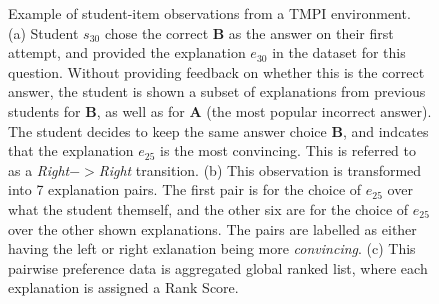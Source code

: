 \documentclass[notitlepage,12pt]{jedm}
\begin{document}
\begin{figure}
	\caption{
		Example of student-item observations from a TMPI environment. 
		(a) Student $s_{30}$ chose the correct \textbf{B} as the answer on 
		their first attempt, and provided the explanation $e_{30}$ in the 
		dataset 
		for this question. 
		Without providing feedback on whether this is the correct answer, the 
		student is shown a subset of explanations from previous students for 
		\textbf{B}, as well as for \textbf{A} (the most popular incorrect 
		answer). 
		The student decides to keep the same answer choice \textbf{B}, and 
		indcates that the explanation $e_25$ is the most convincing.
		This is referred to as a \textit{Right}$->$\textit{Right} transition.
		(b) This observation is transformed into 7 explanation pairs. The first 
		pair is for the choice of $e_{25}$ over what the student themself, 
		and the other six are for the choice of $e_{25}$ over the other shown 
		explanations. 
		The pairs are labelled as either having the left or right exlanation 
		being 
		more \textit{convincing}.
		(c) This pairwise preference data is aggregated global ranked list, 
		where 
		each explanation is assigned a Rank Score. 
	}
	\label{fig:make_pairs_a}
\end{figure}
\end{document}
